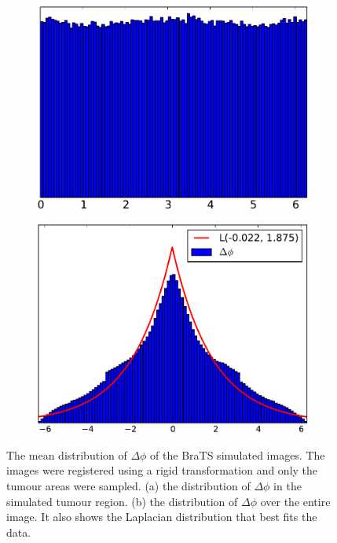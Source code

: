 \begin{figure}
    \centering
    \hspace*{\fill}
    \begin{subfigure}[b]{0.46\columnwidth}
    \includegraphics[width=\textwidth]{statistical_normals/images/distributions/delta_phi_tumour-crop}
    \caption{}\label{subfig:singl_img_phi_tumour}
    \end{subfigure}
    \hfill
    \begin{subfigure}[b]{0.45\columnwidth}
    \includegraphics[width=\textwidth]{statistical_normals/images/distributions/delta_phi_all_laplacian-crop}
    \caption{}\label{subfig:singl_img_phi_all}
    \end{subfigure}
    \hspace*{\fill}
    \caption{The mean distribution of $\Delta \phi$ of the BraTS simulated images.
             The images were registered using a
             rigid transformation and only the tumour
             areas were sampled. (a) the distribution of $\Delta \phi$
             in the simulated tumour region. (b) the distribution of
             $\Delta \phi$ over the entire image. It also shows the
             Laplacian distribution that best fits the data.}
\label{fig:singl_img_phi_distribution}
\end{figure}

